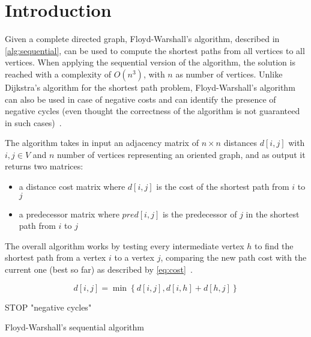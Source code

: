 \section{Introduction}\label{introduction}

Given a complete directed  graph, Floyd-Warshall's algorithm, described in \cref{alg:sequential}, can be used to compute the shortest paths from all vertices to all vertices.
When applying the sequential version of the algorithm, the solution is reached with a complexity of \(O(n^3)\), with \(n\) as number of vertices.
Unlike Dijkstra's algorithm for the shortest path problem, Floyd-Warshall's algorithm can also be used in case of negative costs and can identify the presence of negative cycles 
(even thought the correctness of the algorithm is not guaranteed in such cases)~\cite{fischetti}.

The algorithm takes in input an adjacency matrix of $n \times n$  distances $d[i,j]$ with $i,j \in V$ and $n$ number of vertices representing an oriented graph, and as output it returns two matrices:
\begin{itemize}
    \item a distance cost matrix where \(d[i,j]\) is the cost of the shortest path from \(i\) to \(j\)
    \item a predecessor matrix where \(pred[i,j]\) is the predecessor of \(j\) in the shortest path from \(i\) to \(j\)
  \end{itemize}

The overall algorithm works by testing every intermediate vertex \(h\) to find the shortest path from a vertex \(i\) to a vertex \(j\),
comparing the new path cost with the current one (best so far) as described by \cref{eq:cost}~\cite{fischetti}.

\begin{equation} \label{eq:cost}
    d[i,j] = \min\left\{ d[i,j], d[i,h]+d[h,j] \right\}
\end{equation}

\begin{algorithm}
     {
         {
        }
         {
             {
                STOP  "negative cycles"
            }
        }
    }
\caption{Floyd-Warshall's sequential algorithm}
\label{alg:sequential}
\end{algorithm}

